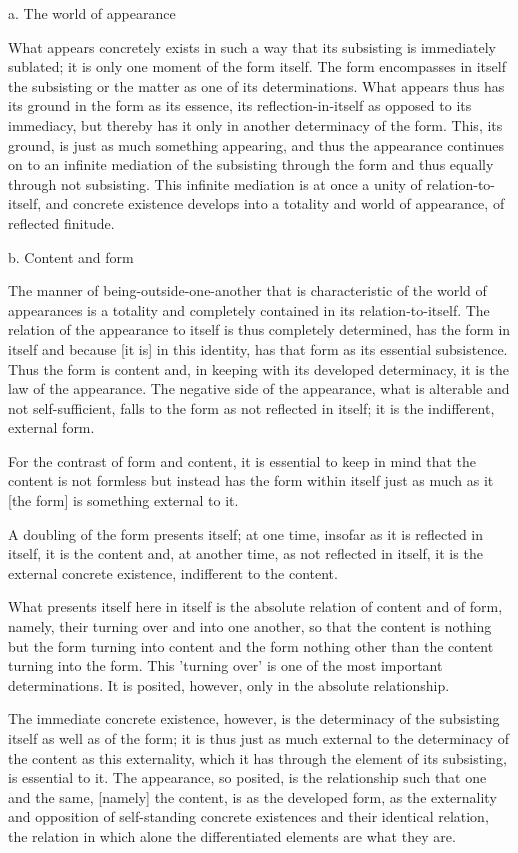 a. The world of appearance

What appears concretely exists in such a way
that its subsisting is immediately sublated;
it is only one moment of the form itself.
The form encompasses in itself the subsisting
or the matter as one of its determinations.
What appears thus has its ground in the form
as its essence, its reflection-in-itself
as opposed to its immediacy, but thereby has it
only in another determinacy of the form.
This, its ground, is just as much something appearing, and
thus the appearance continues on to an infinite mediation
of the subsisting through the form and thus equally through not subsisting.
This infinite mediation is at once a unity of relation-to-itself,
and concrete existence develops into a totality and world of appearance,
of reflected finitude.

b. Content and form

The manner of being-outside-one-another that is
characteristic of the world of appearances is a totality and
completely contained in its relation-to-itself.
The relation of the appearance to itself is thus
completely determined, has the form in itself and
because [it is] in this identity,
has that form as its essential subsistence.
Thus the form is content and,
in keeping with its developed determinacy,
it is the law of the appearance.
The negative side of the appearance,
what is alterable and not self-sufficient,
falls to the form as not reflected in itself;
it is the indifferent, external form.

    For the contrast of form and content,
    it is essential to keep in mind that
    the content is not formless but
    instead has the form within itself
    just as much as it [the form] is
    something external to it.

    A doubling of the form presents itself;
    at one time,
    insofar as it is reflected in itself,
    it is the content and,
    at another time,
    as not reflected in itself,
    it is the external concrete existence,
    indifferent to the content.

    What presents itself here in itself is
    the absolute relation of content and of form, namely,
    their turning over and into one another,
    so that the content is nothing but the form turning into content
    and the form nothing other than the content turning into the form.
    This 'turning over' is one of the most important determinations.
    It is posited, however, only in the absolute relationship.

The immediate concrete existence, however, is
the determinacy of the subsisting itself as well as of the form;
it is thus just as much external to the determinacy of the content
as this externality, which it has through the element of its subsisting,
is essential to it.
The appearance, so posited, is the relationship
such that one and the same, [namely] the content, is
as the developed form, as the externality and opposition of
self-standing concrete existences and their identical relation,
the relation in which alone the differentiated elements are what they are.

